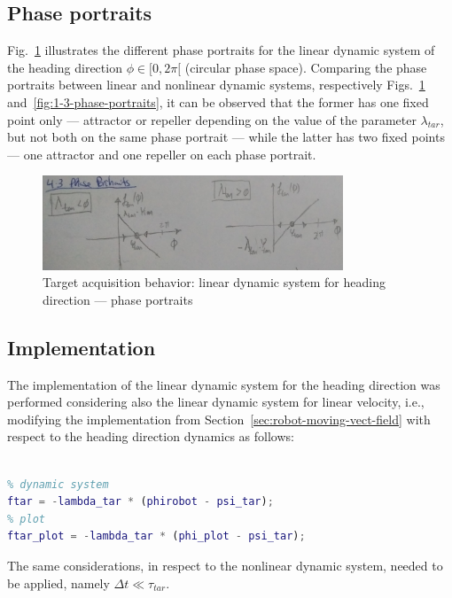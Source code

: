\subsection{Phase portraits}%
\label{sec:phase-portraits-1}
Fig.~\ref{fig:tar-4-3} illustrates the different phase portraits for the linear
dynamic system of the heading direction $\phi \in [0, 2 \pi[$ (circular phase
space). Comparing the phase portraits between linear and nonlinear dynamic
systems, respectively Figs.~\ref{fig:tar-4-3} and~\ref{fig:1-3-phase-portraits},
it can be observed that the former has one fixed point only --- 
attractor or repeller depending on the value of the parameter $\lambda_{tar}$,
but not both on the same phase portrait --- while the latter has two fixed
points --- one attractor and one repeller on each phase portrait.
%
\begin{figure}[!hbt]
\centering
    \includegraphics[width=0.8\textwidth]{./img/tar-4-3.jpg}
  \caption{Target acquisition behavior: linear dynamic system for heading
    direction --- phase portraits}%
\label{fig:tar-4-3}
\end{figure}
%
%
\subsection{Implementation}%
\label{sec:implementation-linear-phi}
The implementation of the linear dynamic system for the heading direction was
performed considering also the linear dynamic system for linear velocity, i.e.,
modifying the implementation from Section~\ref{sec:robot-moving-vect-field} with
respect to the heading direction dynamics as follows: 
%
\begin{lstlisting}[language=matlab, caption={Implementation of linear dynamic
system for heading direction},label=lst:program-dyn-tar-linear-phi,
style=custom-matlab]%

% dynamic system
ftar = -lambda_tar * (phirobot - psi_tar);
% plot
ftar_plot = -lambda_tar * (phi_plot - psi_tar);

\end{lstlisting}

The same considerations, in respect to the nonlinear dynamic system, needed to
be applied, namely $\Delta t \ll \tau_{tar}$.

